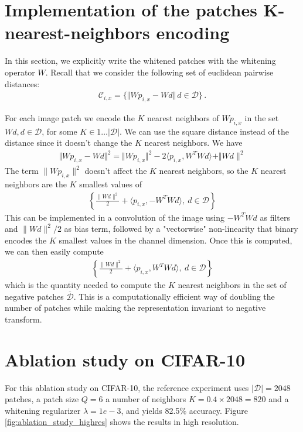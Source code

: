 \documentclass{article} %
\begin{document}
\section{Implementation of the patches K-nearest-neighbors  encoding}

In this section, we explicitly write the whitened patches with the whitening operator $W$.
Recall that  we consider the following set of euclidean pairwise distances:
\begin{align*}\mathcal{C}_{i, x} =\{\Vert W p_{i, x} - W d \Vert\, d\in\mathcal{D} \}\,.\end{align*}

For each image patch we encode the $K$ nearest neighbors of $W p_{i,x}$ in the set $Wd, d \in \mathcal{D}$, for some $ K \in 1 \ldots|\mathcal{D}| $.
We can use the square distance instead of the distance since it doesn't change the $K$ nearest neighbors.
We have 
\begin{align*}
    \Vert Wp_{i,x} - Wd \Vert^2 = \Vert Wp_{i,x} \Vert^2 - 2 \langle p_{i,x}, W^T W d \rangle + \Vert Wd\|^2
\end{align*}
The term $\|Wp_{i,x}\|^2$ doesn't affect the $K$ nearest neighbors, so the $K$ nearest neighbors are the $K$ smallest values of
\begin{align*}
        \left \lbrace \frac{\|Wd \|^2}{2} + \langle p_{i,x}, -W^T W d \rangle, \ d \in \mathcal{D} \right \rbrace
\end{align*}
This can be implemented in a convolution of the image using $-W^T W d$ as filters and $\|Wd \|^2 / 2$ as bias term, followed by a "vectorwise" non-linearity that binary encodes the $K$ smallest values in the channel dimension.
Once this is computed, we can then easily compute 
\begin{align*}
        \left \lbrace \frac{\|Wd \|^2}{2} + \langle p_{i,x}, W^T W d \rangle, \ d \in \mathcal{D} \right \rbrace
\end{align*}
which is the quantity needed to compute the $K$ nearest neighbors in the set of negative patches $\overline{\mathcal{D}}$.
This is a computationally efficient way of doubling the number of patches while making the representation invariant to negative transform.


\section{Ablation study on CIFAR-10}

For this ablation study on CIFAR-10, the reference experiment uses  $|\mathcal{D}|=2048$ patches, a patch size $Q=6$ a number of neighbors $K=0.4\times 2048 = 820$ and a whitening regularizer $\lambda=1e-3$, and yields 82.5\% accuracy.
Figure \ref{fig:ablation_study_highres} shows the results in high resolution.
\end{document}
